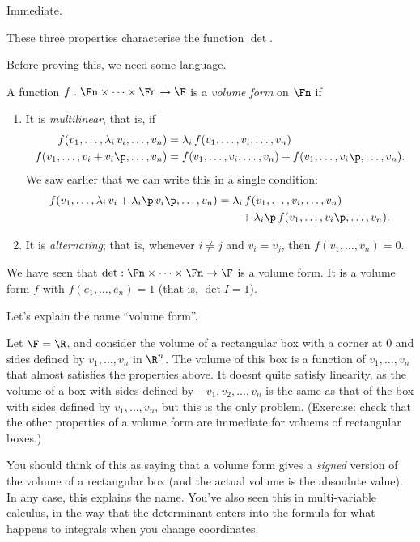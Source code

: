 \begin{proof*}
	Immediate. %
\end{proof*}

\begin{theorem}
	These three properties characterise the function  $\det$. %
\end{theorem}

Before proving this, we need some language.

\begin{definition}
	A function $f:\Fn\times\cdots\times\Fn\to\F$ is a \emph{volume form} on $\Fn$ if
	\begin{enumerate}
		\item It is \emph{multilinear}, that is, if
		\begin{align*}
			f(v_1,\ldots,\lambda_i\,v_i,\ldots,v_n)
			&= \lambda_i\,f(v_1,\ldots,v_i,\ldots,v_n) \\
			f(v_1,\ldots,v_i+v_i\p,\ldots,v_n)
			&= f(v_1,\ldots,v_i,\ldots,v_n)
			 + f(v_1,\ldots,v_i\p,\ldots,v_n).
		\end{align*}
		We saw earlier that we can write this in a single condition:
		\begin{align*}
			f(v_1,\ldots,\lambda_i\,v_i + \lambda_i\p\,v_i\p,\ldots,v_n)
			&= \lambda_i\,f(v_1,\ldots,v_i,\ldots,v_n) \\
			&\qquad + \lambda_i\p \, f(v_1,\ldots,v_i\p,\ldots,v_n). %
		\end{align*}
		
		\item It is \emph{alternating}; that is, whenever $i\neq j$ and $v_i=v_j$, then $f(v_1,\ldots,v_n)=0$. %
	\end{enumerate}
\end{definition}

\begin{example}
	We have seen that $\det:\Fn\times\cdots\times\Fn \to \F$ is a volume form. It is a volume form $f$ with $f(e_1,\ldots,e_n)=1$ (that is, $\det I=1$). %
\end{example}

\begin{remark}
	Let's explain the name ``volume form''.

	Let $\F = \R$, and consider the volume of a rectangular box with a corner at $0$ and sides defined by $v_1, \dots, v_n$ in $\R^n$. The volume of this box is a function of $v_1,\dots,v_n$ that almost satisfies the properties above. It doesnt quite satisfy linearity, as the volume of a box with sides defined by $-v_1,v_2,\dots,v_n$ is the same as that of the box with sides defined by $v_1, \dots, v_n$, but this is the only problem. (Exercise: check that the other properties of a volume form are immediate for voluems of rectangular boxes.)

	You should think of this as saying that a volume form gives a \emph{signed} version of the volume of a rectangular box (and the actual volume is the absoulute value). In any case, this explains the name. You've also seen this in multi-variable calculus, in the way that the determinant enters into the formula for what happens to integrals when you change coordinates.
\end{remark}

